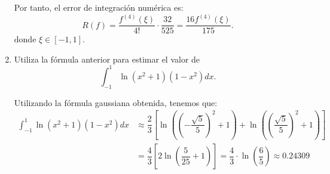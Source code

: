 \begin{ejercicio}[DGIIM 2023/24]
\begin{enumerate}
        Por tanto, el error de integración numérica es:
        \begin{equation*}
            R(f) = \dfrac{f^{(4)}(\xi)}{4!}\cdot \dfrac{32}{525} = \dfrac{16f^{(4)}(\xi)}{175}.
        \end{equation*}
        donde $\xi\in [-1, 1]$.
        \item Utiliza la fórmula anterior para estimar el valor de
        \begin{equation*}
            \int_{-1}^{1} \ln(x^2 + 1)(1 - x^2)dx .
        \end{equation*}

        Utilizando la fórmula gaussiana obtenida, tenemos que:
        \begin{align*}
            \int_{-1}^{1} \ln(x^2 + 1)(1 - x^2)dx &\approx \dfrac{2}{3}\left[\ln\left(\left(-\dfrac{\sqrt{5}}{5}\right)^2 + 1\right) + \ln\left(\left(\dfrac{\sqrt{5}}{5}\right)^2 + 1\right)\right]\\
            &= \dfrac{4}{3}\left[2\ln\left(\dfrac{5}{25} + 1\right)\right] = \dfrac{4}{3}\cdot \ln\left(\dfrac{6}{5}\right) \approx 0.24309
        \end{align*}
    \end{enumerate}
\end{ejercicio}

